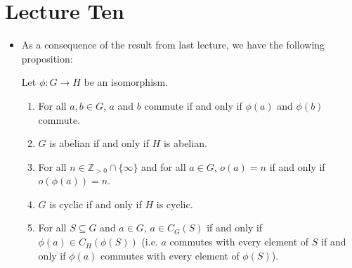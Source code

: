 \section{Lecture Ten}
\begin{itemize}
    \item As a consequence of the result from last lecture, we have the following proposition:
    \begin{proposition}
        Let $\phi:G\rightarrow H$ be an isomorphism.
        \begin{enumerate}
            \item For all $a,b \in G$, $a$ and $b$ commute if and only if $\phi(a)$ and $\phi(b)$ commute.
            \item $G$ is abelian if and only if $H$ is abelian.
            \item For all $n\in \mathbb{Z}_{>0} \cap \{\infty\}$ and for all $a\in G$, $o(a)=n$ if and only if $o(\phi(a))=n$.
            \item $G$ is cyclic if and only if $H$ is cyclic.
            \item For all $S \subseteq G$ and $a \in G$, $a\in C_G(S)$ if and only if $\phi(a) \in C_H(\phi(S))$ (i.e. $a$ commutes with every element of $S$ if and only if $\phi(a)$ commutes with every element of $\phi(S)$).
            

\end{enumerate}
\end{proposition}
\end{itemize}
